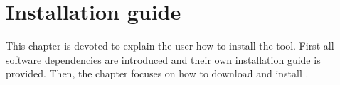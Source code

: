 \chapter{Installation guide}

This chapter is devoted to explain the user how to install the \ESCRIBA tool.
First all software dependencies are introduced and their own installation guide
is provided. Then, the chapter focuses on how to download and install \ESCRIBA.


